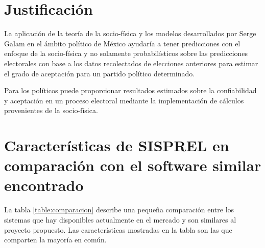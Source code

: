 \section{Justificación}
La aplicación de la teoría de la socio-física y los modelos desarrollados por Serge Galam en el ámbito político de México ayudaría a tener predicciones con el enfoque de la socio-física y no solamente probabilísticos sobre las predicciones electorales con base a los datos recolectados de elecciones anteriores para estimar el grado de aceptación para un partido político determinado.

Para los políticos puede proporcionar resultados estimados sobre la confiabilidad y aceptación en un proceso electoral mediante la implementación de cálculos provenientes de la socio-física.

\section{Características de SISPREL en comparación con el software similar encontrado}
La tabla \ref{table:comparacion} describe una pequeña comparación entre los sistemas que hay disponibles actualmente en el mercado y son similares al proyecto propuesto. Las características mostradas en la tabla son las que comparten la mayoría en común.

